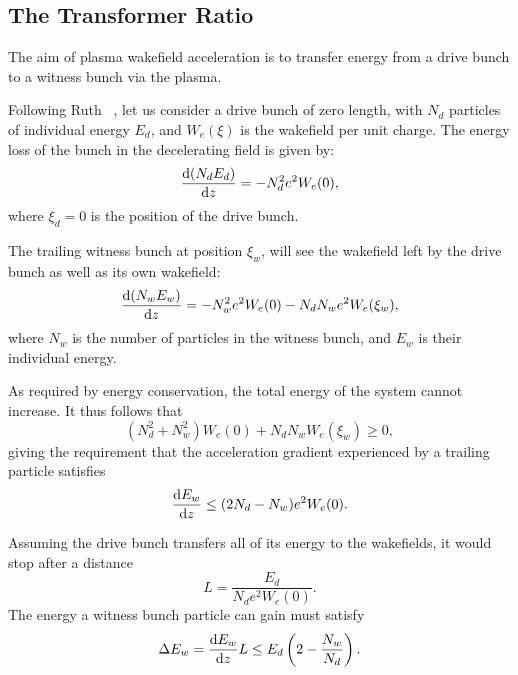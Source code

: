\subsection{The Transformer Ratio}
\label{Int:BPI:TRat}

The aim of plasma wakefield acceleration is to transfer energy from a drive bunch to a witness bunch via the plasma.

Following Ruth \etal~\cite{ruth:1985}, let us consider a drive bunch of zero length, with $N_{d}$ particles of individual energy $E_{d}$, and $W_{e}(\xi)$ is the wakefield per unit charge.
The energy loss of the bunch in the decelerating field is given by:
\begin{equation}
    \frac{\mathrm{d} (N_{d}E_{d})}{\mathrm{d} z} = - N_{d}^{2}e^{2}W_{e}(0), \label{EQ:TRat:Drive}
\end{equation}
where $\xi_{d} = 0$ is the position of the drive bunch.

The trailing witness bunch at position $\xi_{w}$, will see the wakefield left by the drive bunch as well as its own wakefield:
\begin{equation}
    \frac{\mathrm{d} (N_{w}E_{w})}{\mathrm{d} z}
        = - N_{w}^{2}e^{2}W_{e}(0) - N_{d}N_{w}e^{2}W_{e}(\xi_{w}), \label{EQ:TRat:Witness}
\end{equation}
where $N_{w}$ is the number of particles in the witness bunch, and $E_{w}$ is their individual energy.

As required by energy conservation, the total energy of the system cannot increase.
It thus follows that
\begin{equation}
    (N_{d}^{2} + N_{w}^{2})W_{e}(0) + N_{d}N_{w}W_{e}(\xi_{w}) \geq 0, \label{EQ:TRat:EConv}
\end{equation}
giving the requirement that the acceleration gradient experienced by a trailing particle satisfies
\begin{equation}
    \frac{\mathrm{d} E_{w}}{\mathrm{d} z} \leq (2N_{d} - N_{w})e^{2}W_{e}(0). \label{EQ:TRat:Grad}
\end{equation}

Assuming the drive bunch transfers all of its energy to the wakefields, it would stop after a distance
\begin{equation}
    L = \frac{E_{d}}{N_{d}e^{2}W_{e}(0)}. \label{EQ:Trat:LStop}
\end{equation}
The energy a witness bunch particle can gain must satisfy
\begin{equation}
    \Delta E_{w} = \frac{\mathrm{d} E_{w}}{\mathrm{d} z}L
                 \leq E_{d}\left(2-\frac{N_{w}}{N_{d}}\right). \label{EQ:TRat:DeltaE}
\end{equation}

